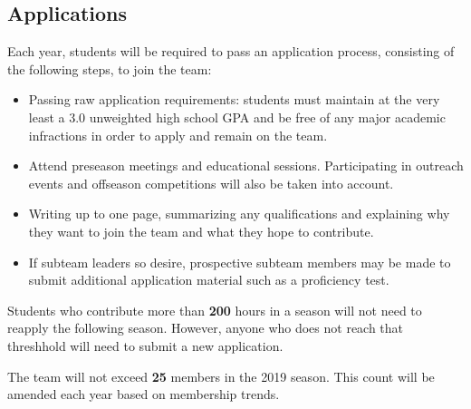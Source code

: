 \documentclass{proc}
\begin{document}
\subsection{Applications}
Each year, students will be required to pass an application process, consisting of the following steps, to join the team:
\begin{itemize}
  \item{Passing raw application requirements: students must maintain at the very least a 3.0 unweighted high school GPA and be free of any major academic infractions in order to apply and remain on the team.}
  \item{Attend preseason meetings and educational sessions. Participating in outreach events and offseason competitions will also be taken into account.}
  \item{Writing up to one page, summarizing any qualifications and explaining why they want to join the team and what they hope to contribute.}
  \item{If subteam leaders so desire, prospective subteam members may be made to submit additional application material such as a proficiency test.}
\end{itemize}
Students who contribute more than \textbf{200} hours in a season will not need to reapply the following season. However, anyone who does not reach that threshhold will need to submit a new application.

The team will not exceed \textbf{25} members in the 2019 season. This count will be amended each year based on membership trends.
\end{document}
